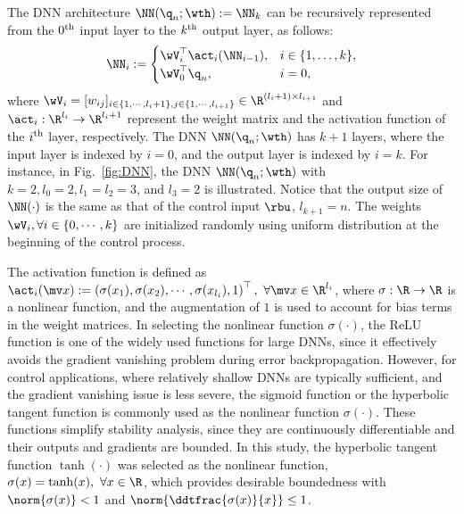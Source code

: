 \documentclass[journal]{IEEEtran}
\begin{document}
The DNN architecture $\NN({\q}_n;\wth) := \NN_k$ can be recursively represented from the $0\textsuperscript{th}$ input layer to the $k\textsuperscript{th}$ output layer, as follows:
\begin{equation}
    \NN_i :=
    \begin{cases}
        \wV_i^\top \act_i(\NN_{i-1}), 
        &
        i\in\{1,\dots ,k\},
        \\
        \wV_0^\top {\q}_n,
        &
        i=0
        ,
    \end{cases}
    \label{eq:DNN:architecture}
\end{equation}
where $\wV_i=[w_{ij}]_{i\in\{1,\cdots,l_i+1\},j\in\{1,\cdots,l_{i+1}\}}\in\R^{(l_i+1)\times l_{i+1}}$ and $\act_i: \R^{l_i}\to\R^{l_i+1}$ represent the weight matrix and the activation function of the $i\textsuperscript{th}$ layer, respectively.
The DNN $\NN({\q}_n;\wth)$ has $k+1$ layers, where the input layer is indexed by $i=0$, and the output layer is indexed by $i=k$.
For instance, in Fig.~\ref{fig:DNN}, the DNN $\NN({\q}_n;\wth)$ with $k=2,l_0=2,l_1=l_2=3$, and $l_3=2$ is illustrated.
Notice that the output size of $\NN(\cdot)$ is the same as that of the control input $\rbu$, \ie $l_{k+1}=n$. 
The weights $\wV_i,\forall i\in\{0,\cdots,k\}$ are initialized randomly using uniform distribution at the beginning of the control process.

The activation function is defined as $\act_i(\mv x):=\left(\sigma(x_1),\sigma(x_2),\cdots, \sigma(x_{l_{i}}), 1\right)^\top,\ \forall\mv x\in\R^{l_i}$, where $\sigma: \R\to\R$ is a nonlinear function, and the augmentation of $1$ is used to account for bias terms in the weight matrices. 
In selecting the nonlinear function $\sigma(\cdot)$, the ReLU function \cite{Maas:2013aa} is one of the widely used functions for large DNNs, since it effectively avoids the gradient vanishing problem during error backpropagation. 
However, for control applications, where relatively shallow DNNs are typically sufficient, and the gradient vanishing issue is less severe, the sigmoid function or the hyperbolic tangent function is commonly used as the nonlinear function $\sigma(\cdot)$. 
These functions simplify stability analysis, since they are continuously differentiable and their outputs and gradients are bounded. 
In this study, the hyperbolic tangent function $\tanh(\cdot)$ was selected as the nonlinear function, \ie $\sigma(x) = \tanh(x),\ \forall x\in\R$, which provides desirable boundedness with $\norm{\sigma(x)}<1$ and $\norm{\ddtfrac{\sigma(x)}{x}}\le 1$.
\end{document}
